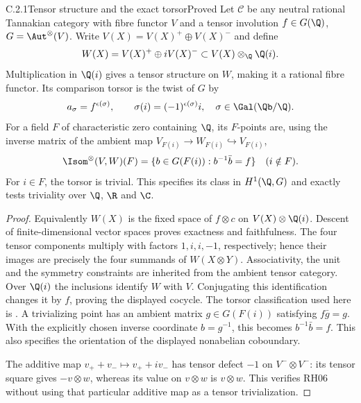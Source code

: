 \begin{result}{C.2.1}{Tensor structure and the exact torsor}{Proved}
Let $\mathcal C$ be any neutral rational Tannakian category with fibre functor $V$ and a tensor involution $f\in G(\Q)$, $G=\Aut^\otimes(V)$. Write $V(X)=V(X)^+\oplus V(X)^-$ and define
\[
 W(X)=V(X)^+\oplus iV(X)^-\subset V(X)\otimes_\Q\Q(i).
\]
Multiplication in $\Q(i)$ gives a tensor structure on $W$, making it a rational fibre functor. Its comparison torsor is the twist of $G$ by
\[
 a_\sigma=f^{\epsilon(\sigma)},\qquad
 \sigma(i)=(-1)^{\epsilon(\sigma)}i,
 \quad \sigma\in\Gal(\Qb/\Q).
\]
For a field $F$ of characteristic zero containing $\Q$, its $F$-points are, using the inverse matrix of the ambient map $V_{F(i)}\to W_{F(i)}\hookrightarrow V_{F(i)}$,
\[
 \Isom^\otimes(V,W)(F)=
 \{b\in G(F(i)):b^{-1}\bar b=f\}\quad(i\notin F).
\]
For $i\in F$, the torsor is trivial. This specifies its class in $H^1(\Q,G)$ and exactly tests triviality over $\Q$, $\R$ and $\C$.
\end{result}
\begin{proof}
Equivalently $W(X)$ is the fixed space of $f\otimes c$ on $V(X)\otimes\Q(i)$. Descent of finite-dimensional vector spaces proves exactness and faithfulness. The four tensor components multiply with factors $1,i,i,-1$, respectively; hence their images are precisely the four summands of $W(X\otimes Y)$. Associativity, the unit and the symmetry constraints are inherited from the ambient tensor category. Over $\Q(i)$ the inclusions identify $W$ with $V$. Conjugating this identification changes it by $f$, proving the displayed cocycle. The torsor classification used here is \cite[Theorem 3.2]{DM1982}. A trivializing point has an ambient matrix $g\in G(F(i))$ satisfying $f\bar g=g$. With the explicitly chosen inverse coordinate $b=g^{-1}$, this becomes $b^{-1}\bar b=f$. This also specifies the orientation of the displayed nonabelian coboundary.

The additive map $v_++v_-\mapsto v_++iv_-$ has tensor defect $-1$ on $V^-\otimes V^-$: its tensor square gives $-v\otimes w$, whereas its value on $v\otimes w$ is $v\otimes w$. This verifies RH06 without using that particular additive map as a tensor trivialization.
\end{proof}

